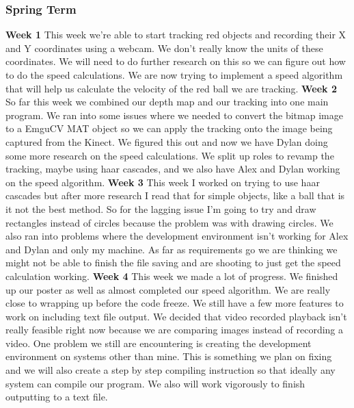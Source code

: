 \documentclass[onecolumn, draftclsnofoot,10pt, compsoc]{IEEEtran}
\begin{document}
\subsubsection{Spring Term}
\textbf{Week 1}
\newline
This week we're able to start tracking red objects and recording their X and Y coordinates using a webcam. We don't really know the units of these coordinates. We will need to do further research on this so we can figure out how to do the speed calculations. We are now trying to implement a speed algorithm that will help us calculate the velocity of the red ball we are tracking.
\newline
\textbf{Week 2}
\newline
So far this week we combined our depth map and our tracking into one main program. We ran into some issues where we needed to convert the bitmap image to a EmguCV MAT object so we can apply the tracking onto the image being captured from the Kinect. We figured this out and now we have Dylan doing some more research on the speed calculations. We split up roles to revamp the tracking, maybe using haar cascades, and we also have Alex and Dylan working on the speed algorithm.
\newline
\textbf{Week 3}
\newline
This week I worked on trying to use haar cascades but after more research I read that for simple objects, like a ball that is it not the best method. So for the lagging issue I'm going to try and draw rectangles instead of circles because the problem was with drawing circles. We also ran into problems where the development environment isn't working for Alex and Dylan and only my machine. As far as requirements go we are thinking we might not be able to finish the file saving and are shooting to just get the speed calculation working.
\newline
\textbf{Week 4}
\newline
This week we made a lot of progress. We finished up our poster as well as almost completed our speed algorithm. We are really close to wrapping up before the code freeze. We still have a few more features to work on including text file output. We decided that video recorded playback isn't really feasible right now because we are comparing images instead of recording a video. One problem we still are encountering is creating the development environment on systems other than mine. This is something we plan on fixing and we will also create a step by step compiling instruction so that ideally any system can compile our program. We also will work vigorously to finish outputting to a text file.
\end{document}
